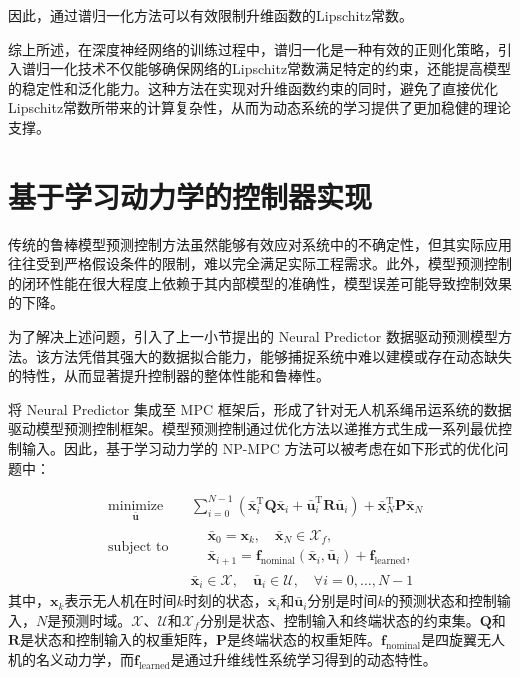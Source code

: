 \documentclass[lang=chs, degree=master, blindreview=false, winfonts=true]{yanputhesis}
\begin{document}
	因此，通过谱归一化方法可以有效限制升维函数的Lipschitz常数。

综上所述，在深度神经网络的训练过程中，谱归一化是一种有效的正则化策略，引入谱归一化技术不仅能够确保网络的Lipschitz常数满足特定的约束，还能提高模型的稳定性和泛化能力。这种方法在实现对升维函数约束的同时，避免了直接优化Lipschitz常数所带来的计算复杂性，从而为动态系统的学习提供了更加稳健的理论支撑。

\section{基于学习动力学的控制器实现}

传统的鲁棒模型预测控制方法虽然能够有效应对系统中的不确定性，但其实际应用往往受到严格假设条件的限制，难以完全满足实际工程需求。此外，模型预测控制的闭环性能在很大程度上依赖于其内部模型的准确性，模型误差可能导致控制效果的下降。

为了解决上述问题，引入了上一小节提出的 Neural Predictor 数据驱动预测模型方法。该方法凭借其强大的数据拟合能力，能够捕捉系统中难以建模或存在动态缺失的特性，从而显著提升控制器的整体性能和鲁棒性。

将 Neural Predictor 集成至 MPC 框架后，形成了针对无人机系绳吊运系统的数据驱动模型预测控制框架。模型预测控制通过优化方法以递推方式生成一系列最优控制输入。因此，基于学习动力学的 NP-MPC 方法可以被考虑在如下形式的优化问题中：

\begin{equation}
	\begin{aligned} \label{nmpc}
		&\operatorname*{minimize}_{\bm{\bar{u}}}& & \sum_{i=0}^{N-1}\left(\bm{\bar{x}}_i^\mathrm{T}\bm{Q}\bm{\bar{x}}_i + \bm{\bar{u}}_i^\mathrm{T}\bm{R}\bm{\bar{u}}_i\right) + \bm{\bar{x}}_N^\mathrm{T}\bm{P}\bm{\bar{x}}_N  \\
		&\text{subject to}& & \begin{aligned}
			&\bm{\bar{x}}_{0} = \bm{x}_k, \quad \bm{\bar{x}}_{N} \in \mathcal{X}_f, \\
			&\bm{\bar{x}}_{i+1} = \bm{f}_{\text{nominal}}(\bm{\bar{x}}_i, \bm{\bar{u}}_i) + \bm{f}_{\text{learned}},
		\end{aligned} \\
		&&& \bm{\bar{x}}_i \in \mathcal{X}, \quad \bm{\bar{u}}_i \in \mathcal{U}, \quad \forall i = 0, \ldots, N-1
	\end{aligned}
\end{equation}
其中，$\bm{x}_k$表示无人机在时间$k$时刻的状态，$\bm{\bar{x}}_i$和$\bm{\bar{u}}_i$分别是时间$k$的预测状态和控制输入，$N$是预测时域。$\mathcal{X}$、$\mathcal{U}$和$\mathcal{X}_f$分别是状态、控制输入和终端状态的约束集。$\bm{Q}$和$\bm{R}$是状态和控制输入的权重矩阵，$\bm{P}$是终端状态的权重矩阵。$\bm{f}_{\text{nominal}}$是四旋翼无人机的名义动力学，而$\bm{f}_{\text{learned}}$是通过升维线性系统学习得到的动态特性。
\end{document}
